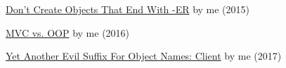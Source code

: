 \documentclass{article}
\begin{document}


\href{https://www.yegor256.com/2015/03/09/objects-end-with-er.html}{Don't Create Objects That End With -ER} by me (2015)

\href{https://www.yegor256.com/2016/12/13/mvc-vs-oop.html}{MVC vs. OOP} by me (2016)

\href{https://www.yegor256.com/2017/09/12/evil-object-name-suffix-client.html}{Yet Another Evil Suffix For Object Names: Client} by me (2017)
\end{document}
